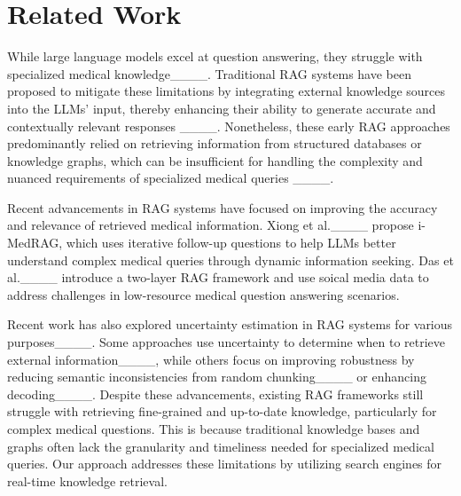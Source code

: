 \section{Related Work}
\label{related_work}
While large language models excel at question answering, they struggle with specialized medical knowledge____.
Traditional RAG systems have been proposed to mitigate these limitations by integrating external knowledge sources into the LLMs' input, thereby enhancing their ability to generate accurate and contextually relevant responses ____. Nonetheless, these early RAG approaches predominantly relied on retrieving information from structured databases or knowledge graphs, which can be insufficient for handling the complexity and nuanced requirements of specialized medical queries ____.

Recent advancements in RAG systems have focused on improving the accuracy and relevance of retrieved medical information. 
Xiong et al.____ propose i-MedRAG, which uses iterative follow-up questions to help LLMs better understand complex medical queries through dynamic information seeking.
Das et al.____ introduce a two-layer RAG framework and use soical media data to address challenges in low-resource medical question answering scenarios. 

Recent work has also explored uncertainty estimation in RAG systems for various purposes____. 
Some approaches use uncertainty to determine when to retrieve external information____, while others focus on improving robustness by reducing semantic inconsistencies from random chunking____ or enhancing decoding____. 
Despite these advancements, existing RAG frameworks still struggle with retrieving fine-grained and up-to-date knowledge, particularly for complex medical questions. 
This is because traditional knowledge bases and graphs often lack the granularity and timeliness needed for specialized medical queries.
Our approach addresses these limitations by utilizing search engines for real-time knowledge retrieval.